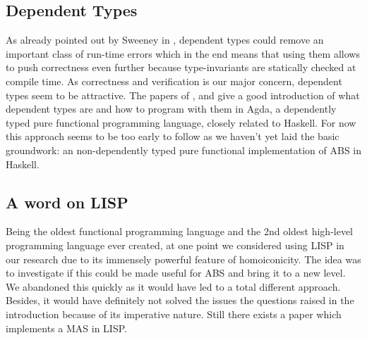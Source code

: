 \subsection{Dependent Types}
As already pointed out by Sweeney in \cite{sweeney_next_2006}, dependent types could remove an important class of run-time errors which in the end means that using them allows to push correctness even further because type-invariants are statically checked at compile time. As correctness and verification is our major concern, dependent types seem to be attractive. The papers of \cite{norell_dependently_2009}, \cite{bove_brief_2009} and \cite{bove_dependent_2009} give a good introduction of what dependent types are and how to program with them in Agda, a dependently typed pure functional programming language, closely related to Haskell. For now this approach seems to be too early to follow as we haven't yet laid the basic groundwork: an non-dependently typed pure functional implementation of ABS in Haskell.


\subsection{A word on LISP}
Being the oldest functional programming language and the 2nd oldest high-level programming language ever created, at one point we considered using LISP in our research due to its immensely powerful feature of homoiconicity. The idea was to investigate if this could be made useful for ABS and bring it to a new level. We abandoned this quickly as it would have led to a total different approach. Besides, it would have definitely not solved the issues the questions raised in the introduction because of its imperative nature. Still there exists a paper \cite{kawabe_nepi2programming_2000} which implements a MAS in LISP.